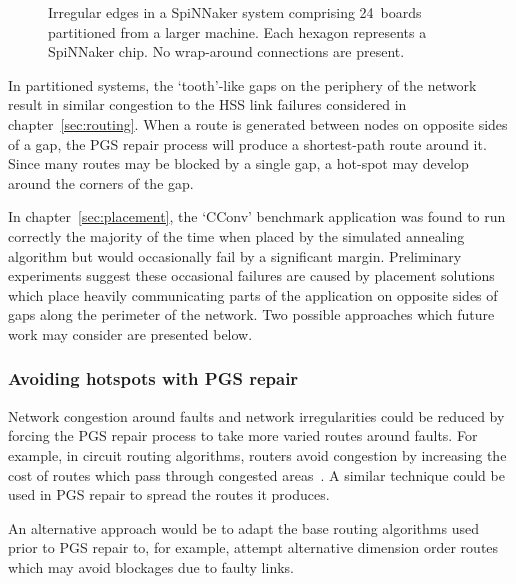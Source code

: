 			\begin{figure}
				\center
				
				\caption[Irregular edges of a partitioned SpiNNaker system.]%
				{Irregular edges in a SpiNNaker system comprising 24~boards
				partitioned from a larger machine.  Each hexagon represents a SpiNNaker
				chip. No wrap-around connections are present.}
				\label{fig:spalloc-mesh}
			\end{figure}
			
			In partitioned systems, the `tooth'-like gaps on the periphery of the
			network result in similar congestion to the HSS link failures considered
			in chapter~\ref{sec:routing}. When a route is generated between nodes on
			opposite sides of a gap, the PGS repair process will produce a
			shortest-path route around it. Since many routes may be blocked by a
			single gap, a hot-spot may develop around the corners of the gap.
			
			In chapter~\ref{sec:placement}, the `CConv' benchmark application was
			found to run correctly the majority of the time when placed by the
			simulated annealing algorithm but would occasionally fail by a
			significant margin. Preliminary experiments suggest these occasional
			failures are caused by placement solutions which place heavily
			communicating parts of the application on opposite sides of gaps along
			the perimeter of the network. Two possible approaches which future work
			may consider are presented below.
			
			\subsubsection{Avoiding hotspots with PGS repair}
				
				\label{sec:pgs-repair-improvements}	
				
				Network congestion around faults and network irregularities could be
				reduced by forcing the PGS repair process to take more varied routes
				around faults. For example, in circuit routing algorithms, routers
				avoid congestion by increasing the cost of routes which pass through
				congested areas~\cite{kahng11}. A similar technique could be used in
				PGS repair to spread the routes it produces.
				
				An alternative approach would be to adapt the base routing algorithms
				used prior to PGS repair to, for example, attempt alternative dimension
				order routes which may avoid blockages due to faulty links.
			
